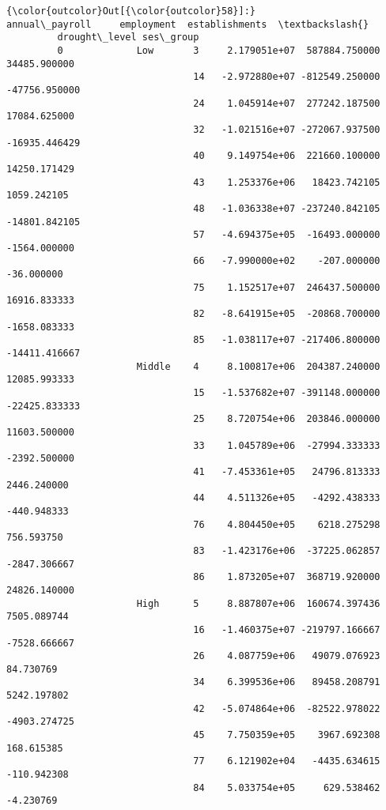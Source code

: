 \documentclass[11pt]{article}
\begin{document}
\begin{Verbatim}[commandchars=\\\{\}]
{\color{outcolor}Out[{\color{outcolor}58}]:}                             annual\_payroll     employment  establishments  \textbackslash{}
         drought\_level ses\_group                                                     
         0             Low       3     2.179051e+07  587884.750000    34485.900000   
                                 14   -2.972880e+07 -812549.250000   -47756.950000   
                                 24    1.045914e+07  277242.187500    17084.625000   
                                 32   -1.021516e+07 -272067.937500   -16935.446429   
                                 40    9.149754e+06  221660.100000    14250.171429   
                                 43    1.253376e+06   18423.742105     1059.242105   
                                 48   -1.036338e+07 -237240.842105   -14801.842105   
                                 57   -4.694375e+05  -16493.000000    -1564.000000   
                                 66   -7.990000e+02    -207.000000      -36.000000   
                                 75    1.152517e+07  246437.500000    16916.833333   
                                 82   -8.641915e+05  -20868.700000    -1658.083333   
                                 85   -1.038117e+07 -217406.800000   -14411.416667   
                       Middle    4     8.100817e+06  204387.240000    12085.993333   
                                 15   -1.537682e+07 -391148.000000   -22425.833333   
                                 25    8.720754e+06  203846.000000    11603.500000   
                                 33    1.045789e+06  -27994.333333    -2392.500000   
                                 41   -7.453361e+05   24796.813333     2446.240000   
                                 44    4.511326e+05   -4292.438333     -440.948333   
                                 76    4.804450e+05    6218.275298      756.593750   
                                 83   -1.423176e+06  -37225.062857    -2847.306667   
                                 86    1.873205e+07  368719.920000    24826.140000   
                       High      5     8.887807e+06  160674.397436     7505.089744   
                                 16   -1.460375e+07 -219797.166667    -7528.666667   
                                 26    4.087759e+06   49079.076923       84.730769   
                                 34    6.399536e+06   89458.208791     5242.197802   
                                 42   -5.074864e+06  -82522.978022    -4903.274725   
                                 45    7.750359e+05    3967.692308      168.615385   
                                 77    6.121902e+04   -4435.634615     -110.942308   
                                 84    5.033754e+05     629.538462       -4.230769   
         

\end{Verbatim}
\end{document}
